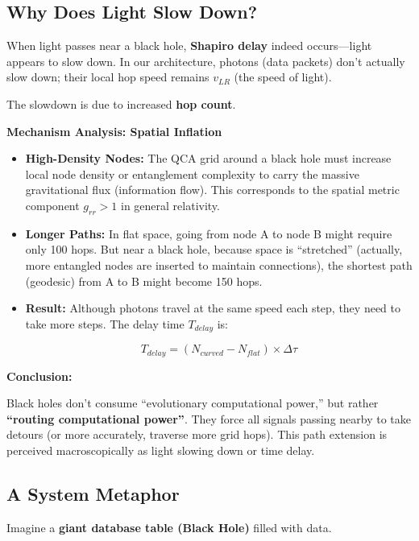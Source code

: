 \documentclass[11pt,a4paper,twoside]{book}
\begin{document}
\subsection{Why Does Light Slow Down?}

When light passes near a black hole, \textbf{Shapiro delay} indeed occurs---light appears to slow down. In our architecture, photons (data packets) don't actually slow down; their local hop speed remains \textbf{$v_{LR}$} (the speed of light).

The slowdown is due to increased \textbf{hop count}.

\textbf{Mechanism Analysis: Spatial Inflation}

\begin{itemize}
\item \textbf{High-Density Nodes:} The QCA grid around a black hole must increase local node density or entanglement complexity to carry the massive gravitational flux (information flow). This corresponds to the spatial metric component \textbf{$g_{rr} > 1$} in general relativity.

\item \textbf{Longer Paths:} In flat space, going from node A to node B might require only 100 hops. But near a black hole, because space is ``stretched'' (actually, more entangled nodes are inserted to maintain connections), the shortest path (geodesic) from A to B might become 150 hops.

\item \textbf{Result:} Although photons travel at the same speed each step, they need to take more steps. The delay time \textbf{$T_{delay}$} is:

    $$T_{delay} = (N_{curved} - N_{flat}) \times \Delta \tau$$
\end{itemize}

\textbf{Conclusion:}

Black holes don't consume ``evolutionary computational power,'' but rather \textbf{``routing computational power''}. They force all signals passing nearby to take detours (or more accurately, traverse more grid hops). This path extension is perceived macroscopically as light slowing down or time delay.

\subsection{A System Metaphor}

Imagine a \textbf{giant database table (Black Hole)} filled with data.
\end{document}
